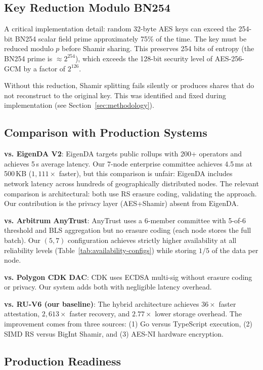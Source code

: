 \subsection{Key Reduction Modulo BN254}

A critical implementation detail: random 32-byte AES keys can exceed the
254-bit BN254 scalar field prime approximately 75\% of the time. The key
must be reduced modulo $p$ before Shamir sharing. This preserves 254
bits of entropy (the BN254 prime is $\approx 2^{254}$), which exceeds
the 128-bit security level of AES-256-GCM by a factor of $2^{126}$.

Without this reduction, Shamir splitting fails silently or produces
shares that do not reconstruct to the original key. This was identified
and fixed during implementation (see Section~\ref{sec:methodology}).

\subsection{Comparison with Production Systems}

\textbf{vs. EigenDA V2}: EigenDA targets public rollups with 200+
operators and achieves 5\,s average latency. Our 7-node enterprise
committee achieves 4.5\,ms at 500\,KB ($1{,}111\times$ faster), but
this comparison is unfair: EigenDA includes network latency across
hundreds of geographically distributed nodes. The relevant comparison is
architectural: both use RS erasure coding, validating the approach. Our
contribution is the privacy layer (AES+Shamir) absent from EigenDA.

\textbf{vs. Arbitrum AnyTrust}: AnyTrust uses a 6-member committee
with 5-of-6 threshold and BLS aggregation but no erasure coding (each
node stores the full batch). Our $(5,7)$ configuration achieves strictly
higher availability at all reliability levels (Table~\ref{tab:availability-configs})
while storing $1/5$ of the data per node.

\textbf{vs. Polygon CDK DAC}: CDK uses ECDSA multi-sig without erasure
coding or privacy. Our system adds both with negligible latency overhead.

\textbf{vs. RU-V6 (our baseline)}: The hybrid architecture achieves
$36\times$ faster attestation, $2{,}613\times$ faster recovery, and
$2.77\times$ lower storage overhead. The improvement comes from three
sources: (1) Go versus TypeScript execution, (2) SIMD RS versus BigInt
Shamir, and (3) AES-NI hardware encryption.

\subsection{Production Readiness}

